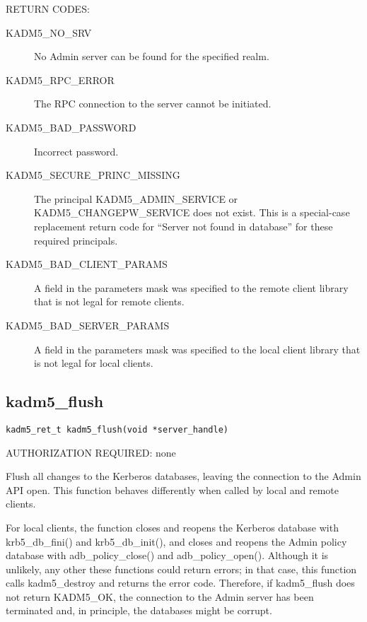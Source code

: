 RETURN CODES: 

\begin{description}
\item[KADM5_NO_SRV] No Admin server can be found for the
specified realm.

\item[KADM5_RPC_ERROR] The RPC connection to the server cannot be
initiated.

\item[KADM5_BAD_PASSWORD] Incorrect password.

\item[KADM5_SECURE_PRINC_MISSING] The principal
KADM5_ADMIN_SERVICE or KADM5_CHANGEPW_SERVICE does not
exist.  This is a special-case replacement return code for ``Server
not found in database'' for these required principals.

\item[KADM5_BAD_CLIENT_PARAMS] A field in the parameters mask was
specified to the remote client library that is not legal for remote
clients.

\item[KADM5_BAD_SERVER_PARAMS] A field in the parameters mask was
specified to the local client library that is not legal for local
clients.
\end{description}

\subsection{kadm5_flush}

\begin{verbatim}
kadm5_ret_t kadm5_flush(void *server_handle)
\end{verbatim}

AUTHORIZATION REQUIRED: none

Flush all changes to the Kerberos databases, leaving the connection to
the Admin API open.  This function behaves differently when called by
local and remote clients.

For local clients, the function closes and reopens the Kerberos
database with krb5_db_fini() and krb5_db_init(), and closes and
reopens the Admin policy database with adb_policy_close() and
adb_policy_open().  Although it is unlikely, any other these functions
could return errors; in that case, this function calls
kadm5_destroy and returns the error code.  Therefore, if
kadm5_flush does not return KADM5_OK, the connection to the
Admin server has been terminated and, in principle, the databases
might be corrupt.


